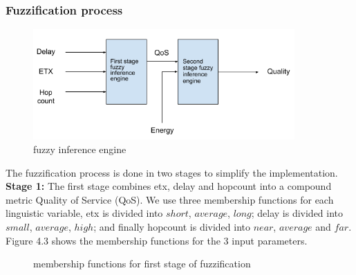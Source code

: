 \subsubsection{Fuzzification process}
\begin{figure}[H]
\centering
\includegraphics[width=100mm]{FIS.png}
\caption{fuzzy inference engine}
\label{fig:method}
\end{figure}
The fuzzification process is done in two stages to simplify the implementation.
\textbf{Stage 1:} The first stage combines etx, delay and hopcount into a compound metric Quality of Service (QoS). We use three membership functions for each linguistic variable, etx is divided into $ short $, $ average $, $ long $; delay is divided into $ small $, $ average $, $ high $; and finally hopcount is divided into $ near $, $ average $ and $ far $.\\
Figure 4.3 shows the membership functions for the 3 input parameters.
\begin{figure}[h!]
\centering
{}
\caption{membership functions for first stage of fuzzification}
\label{fig:method}
\end{figure}
